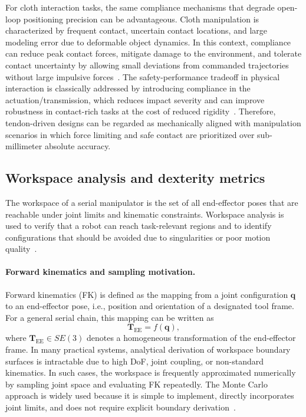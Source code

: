 For cloth interaction tasks, the same compliance mechanisms that degrade open-loop positioning precision can be advantageous. Cloth manipulation is characterized by frequent contact, uncertain contact locations, and large modeling error due to deformable object dynamics. In this context, compliance can reduce peak contact forces, mitigate damage to the environment, and tolerate contact uncertainty by allowing small deviations from commanded trajectories without large impulsive forces~\cite{Bicchi2004FastSoftArm,Rao2021TDCRModeling}. The safety-performance tradeoff in physical interaction is classically addressed by introducing compliance in the actuation/transmission, which reduces impact severity and can improve robustness in contact-rich tasks at the cost of reduced rigidity~\cite{Bicchi2004FastSoftArm}. Therefore, tendon-driven designs can be regarded as mechanically aligned with manipulation scenarios in which force limiting and safe contact are prioritized over sub-millimeter absolute accuracy. %

\subsection{Workspace analysis and dexterity metrics}
\label{sec:workspace_analysis_sampling_metrics}

The workspace of a serial manipulator is the set of all end-effector poses that are reachable under joint limits and kinematic constraints. Workspace analysis is used to verify that a robot can reach task-relevant regions and to identify configurations that should be avoided due to singularities or poor motion quality~\cite{Rastegar1990WorkspaceMonteCarlo,Dong2013WorkspaceDensity}.

\paragraph{Forward kinematics and sampling motivation.}
Forward kinematics (\ac{FK}) is defined as the mapping from a joint configuration $\mathbf{q}$ to an end-effector pose, i.e., position and orientation of a designated tool frame. For a general serial chain, this mapping can be written as
\begin{equation}
\mathbf{T}_{\mathrm{EE}} = f(\mathbf{q}),
\label{eq:fk_mapping}
\end{equation}
where $\mathbf{T}_{\mathrm{EE}} \in SE(3)$ denotes a homogeneous transformation of the end-effector frame. In many practical systems, analytical derivation of workspace boundary surfaces is intractable due to high \ac{DoF}, joint coupling, or non-standard kinematics. In such cases, the workspace is frequently approximated numerically by sampling joint space and evaluating \ac{FK} repeatedly. The Monte Carlo approach is widely used because it is simple to implement, directly incorporates joint limits, and does not require explicit boundary derivation~\cite{Rastegar1990WorkspaceMonteCarlo}.

